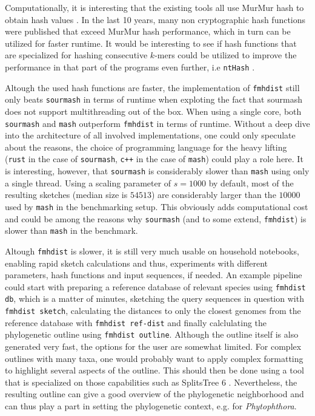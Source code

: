 Computationally, it is interesting that the existing tools all use MurMur hash
to obtain hash values
\cite{ondovMashFastGenome2016,bagciMicrobialPhylogeneticContext2021,irberLightweightCompositionalAnalysis2022}.
In the last 10 years, many non cryptographic hash functions were published that
exceed MurMur hash performance, which in turn can be utilized for faster
runtime. It would be interesting to see if hash functions that are specialized
for hashing consecutive $k$-mers could be utilized to improve the performance in
that part of the programs even further, i.e \texttt{ntHash}
\cite{mohamadiNtHashRecursiveNucleotide2016}.

Altough the used hash functions are faster, the implementation of
\texttt{fmhdist} still only beats \texttt{sourmash} in terms of runtime when
exploting the fact that sourmash does not support multithreading out of the box.
When using a single core, both \texttt{sourmash} and \texttt{mash} outperform
\texttt{fmhdist} in terms of runtime. Without a deep dive into the architecture
of all involved implementations, one could only speculate about the reasons, the
choice of programming language for the heavy lifting (\texttt{rust} in the case
of \texttt{sourmash}, \texttt{c++} in the case of \texttt{mash}) could play a
role here. It is interesting, however, that \texttt{sourmash} is considerably
slower than \texttt{mash} using only a single thread. Using a scaling parameter
of $s=1000$ by default, most of the resulting sketches (median size is $54513$)
are considerably larger than the $10000$ used by \texttt{mash} in the
benchmarking setup. This obviously adds computational cost and could be among
the reasons why \texttt{sourmash} (and to some extend, \texttt{fmhdist}) is
slower than \texttt{mash} in the benchmark.

Altough \texttt{fmhdist} is slower, it is still very much usable on household
notebooks, enabling rapid sketch calculations and thus, experiments with
different parameters, hash functions and input sequences, if needed. An example
pipeline could start with preparing a reference database of relevant species
using \texttt{fmhdist db}, which is a matter of minutes, sketching the query
sequences in question with \texttt{fmhdist sketch}, calculating the distances to
only the closest genomes from the reference database with \texttt{fmhdist
ref-dist} and finally calclulating the phylogenetic outline using
\texttt{fmhdist outline}. Although the outline itself is also generated very
fast, the options for the user are somewhat limited. For complex outlines with
many taxa, one would probably want to apply complex formatting to highlight
several aspects of the outline. This should then be done using a tool that is
specialized on those capabilities such as SplitsTree 6
\cite{husonApplicationPhylogeneticNetworks2006}. Nevertheless, the resulting
outline can give a good overview of the phylogenetic neighborhood and can thus
play a part in setting the phylogenetic context, e.g. for \textit{Phytophthora}.
